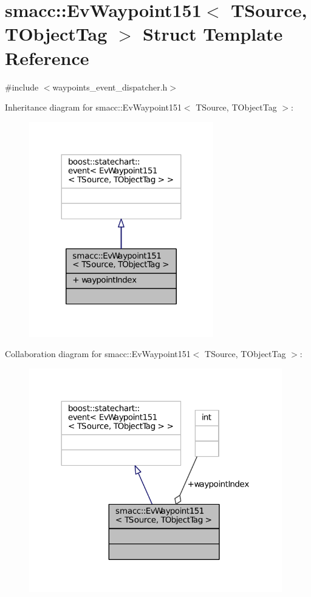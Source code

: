 \hypertarget{structsmacc_1_1EvWaypoint151}{}\section{smacc\+:\+:Ev\+Waypoint151$<$ T\+Source, T\+Object\+Tag $>$ Struct Template Reference}
\label{structsmacc_1_1EvWaypoint151}


{\ttfamily \#include $<$waypoints\+\_\+event\+\_\+dispatcher.\+h$>$}



Inheritance diagram for smacc\+:\+:Ev\+Waypoint151$<$ T\+Source, T\+Object\+Tag $>$\+:
\nopagebreak
\begin{figure}[H]
\begin{center}
\leavevmode
\includegraphics[width=227pt]{structsmacc_1_1EvWaypoint151__inherit__graph}
\end{center}
\end{figure}


Collaboration diagram for smacc\+:\+:Ev\+Waypoint151$<$ T\+Source, T\+Object\+Tag $>$\+:
\nopagebreak
\begin{figure}[H]
\begin{center}
\leavevmode
\includegraphics[width=312pt]{structsmacc_1_1EvWaypoint151__coll__graph}
\end{center}
\end{figure}

